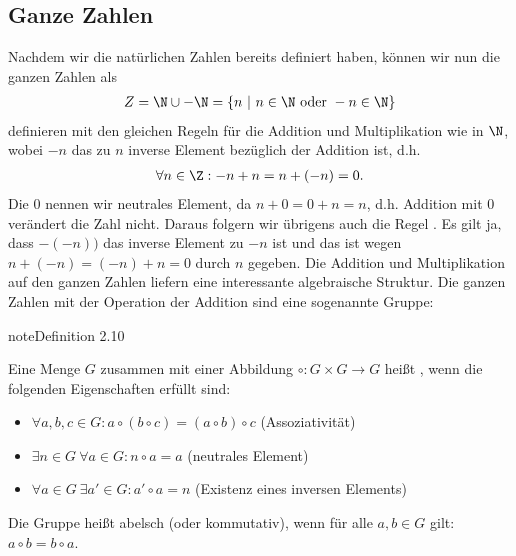 \documentclass[letterpaper,10pt,english]{jupyterBook}
\begin{document}
\subsection{Ganze Zahlen}
\label{\detokenize{grundlagen/zahlensysteme:ganze-zahlen}}
Nachdem wir die natürlichen Zahlen bereits definiert haben, können wir nun die ganzen Zahlen als
\begin{equation*}
\begin{split} Z = \N \cup -\N = \{n ~|~n \in \N \text{ oder } -n \in \N \}\end{split}
\end{equation*}
definieren mit den gleichen Regeln für die Addition und Multiplikation wie in \(\N\), wobei \(-n\) das zu \(n\) inverse Element bezüglich der Addition ist, d.h.
\begin{equation*}
\begin{split}\forall n \in \Z: -n + n = n + (-n) = 0.\end{split}
\end{equation*}
Die \(0\) nennen wir neutrales Element, da \(n+0=0+n=n\), d.h. Addition mit \(0\) verändert die Zahl nicht.
Daraus folgern wir übrigens auch die Regel . Es gilt ja, dass \(-(-n))\) das inverse Element zu \(-n\) ist und das ist wegen \(n+(-n) = (-n)+n=0\) durch \(n\) gegeben.
Die Addition und Multiplikation auf den ganzen Zahlen liefern eine interessante algebraische Struktur.
Die ganzen Zahlen mit der Operation der Addition sind eine sogenannte Gruppe:
\label{grundlagen/zahlensysteme:definition-4}
\begin{sphinxadmonition}{note}{Definition 2.10}



Eine Menge \(G\) zusammen mit einer Abbildung \(\circ: G \times G \rightarrow G\) heißt , wenn die folgenden Eigenschaften erfüllt sind:
\begin{itemize}
\item {} 
\( \forall a,b,c \in G: a \circ (b \circ c) = (a\circ b) \circ c\) (Assoziativität)

\item {} 
\(\exists n \in G~ \forall a \in G: n \circ a = a\) (neutrales Element)

\item {} 
\(\forall a \in G~\exists a' \in G: a' \circ a = n\) (Existenz eines inversen Elements)

\end{itemize}

Die Gruppe heißt abelsch (oder kommutativ), wenn für alle \(a,b \in G\) gilt: \(a \circ b = b \circ a\).
\end{sphinxadmonition}
\end{document}
